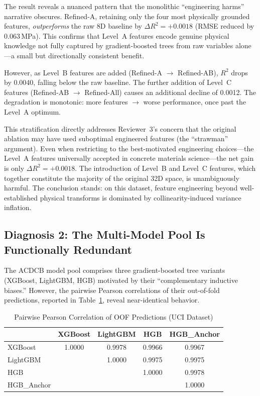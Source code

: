 \documentclass[journal]{IEEEtran}
\begin{document}
The result reveals a nuanced pattern that the monolithic ``engineering harms'' narrative obscures. Refined-A, retaining only the four most physically grounded features, \emph{outperforms} the raw 8D baseline by $\Delta R^2 = +0.0018$ (RMSE reduced by 0.063\,MPa). This confirms that Level~A features encode genuine physical knowledge not fully captured by gradient-boosted trees from raw variables alone---a small but directionally consistent benefit.

However, as Level~B features are added (Refined-A $\to$ Refined-AB), $R^2$ drops by 0.0040, falling below the raw baseline. The further addition of Level~C features (Refined-AB $\to$ Refined-All) causes an additional decline of 0.0012. The degradation is monotonic: more features $\to$ worse performance, once past the Level~A optimum.

This stratification directly addresses Reviewer~3's concern that the original ablation may have used suboptimal engineered features (the ``strawman'' argument). Even when restricting to the best-motivated engineering choices---the Level~A features universally accepted in concrete materials science---the net gain is only $\Delta R^2 = +0.0018$. The introduction of Level~B and Level~C features, which together constitute the majority of the original 32D space, is unambiguously harmful. The conclusion stands: on this dataset, feature engineering beyond well-established physical transforms is dominated by collinearity-induced variance inflation.

\subsection{Diagnosis 2: The Multi-Model Pool Is Functionally Redundant}

The ACDCB model pool comprises three gradient-boosted tree variants (XGBoost, LightGBM, HGB) motivated by their ``complementary inductive biases.'' However, the pairwise Pearson correlations of their out-of-fold predictions, reported in Table~\ref{tab:model_corr}, reveal near-identical behavior.

\begin{table}[!t]
\renewcommand{\arraystretch}{1.2}
\caption{Pairwise Pearson Correlation of OOF Predictions (UCI Dataset)}
\label{tab:model_corr}
\centering
\begin{tabular}{lcccc}
\toprule
& \textbf{XGBoost} & \textbf{LightGBM} & \textbf{HGB} & \textbf{HGB\_Anchor} \\
\midrule
XGBoost    & 1.0000 & 0.9978 & 0.9966 & 0.9967 \\
LightGBM   &        & 1.0000 & 0.9975 & 0.9975 \\
HGB        &        &        & 1.0000 & 0.9978 \\
HGB\_Anchor &        &        &        & 1.0000 \\
\bottomrule
\end{tabular}
\end{table}
\end{document}
